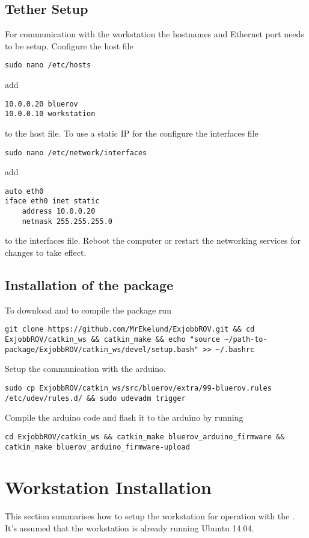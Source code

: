 \subsection{Tether Setup}
For communication with the workstation the hostnames and Ethernet port needs to be setup.
Configure the host file 
\begin{lstlisting}
sudo nano /etc/hosts
\end{lstlisting}
add
\begin{lstlisting}
10.0.0.20 bluerov
10.0.0.10 workstation
\end{lstlisting}
to the host file. To use a static IP for the \abbrROV configure the interfaces file
\begin{lstlisting}
sudo nano /etc/network/interfaces
\end{lstlisting}
add 
\begin{lstlisting}
auto eth0
iface eth0 inet static
    address 10.0.0.20
    netmask 255.255.255.0
\end{lstlisting}
to the interfaces file. Reboot the computer or restart the networking services for changes to take effect.

\subsection{Installation of the \abbrROV package}
To download and to compile the package run
\begin{lstlisting}
git clone https://github.com/MrEkelund/ExjobbROV.git && cd ExjobbROV/catkin_ws && catkin_make && echo "source ~/path-to-package/ExjobbROV/catkin_ws/devel/setup.bash" >> ~/.bashrc 
\end{lstlisting}

Setup the communication with the arduino.
\begin{lstlisting}
sudo cp ExjobbROV/catkin_ws/src/bluerov/extra/99-bluerov.rules /etc/udev/rules.d/ && sudo udevadm trigger
\end{lstlisting}

Compile the arduino code and flash it to the arduino by running
\begin{lstlisting}
cd ExjobbROV/catkin_ws && catkin_make bluerov_arduino_firmware && catkin_make bluerov_arduino_firmware-upload
\end{lstlisting}

\section{Workstation Installation}
This section summarises how to setup the workstation for operation with the \abbrROV. It's assumed that the workstation is already running Ubuntu 14.04. 

